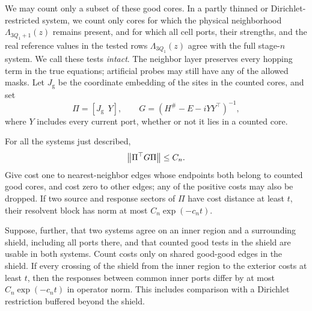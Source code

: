 We may count only a subset of these good cores. In a partly thinned
or Dirichlet-restricted system, we count only cores for which the
physical neighborhood $\Lambda_{3Q_1+1}(z)$ remains present, and for
which all cell ports, their strengths, and the real reference values
in the tested rows $\Lambda_{3Q_1}(z)$ agree with the full stage-$n$
system. We call these tests \emph{intact}. The neighbor layer preserves
every hopping term in the true equations; artificial probes may still
have any of the allowed masks.
Let $J_{\mathrm g}$ be the coordinate embedding of the sites in the
counted cores, and set
\[
 \Pi=[J_{\mathrm g}\ \ Y],\qquad
 G=(H^\#-E-iYY^\top)^{-1},
\]
where $Y$ includes every current port, whether or not it lies in a
counted core.

\begin{proposition}
\label{screen:projected}
For all the systems just described,
\begin{equation}
 \left\lVert\Pi^\top G\Pi\right\rVert\leq C_n.
 \label{screen:projected-bound}
\end{equation}
Give cost one to nearest-neighbor edges whose endpoints both belong
to counted good cores, and cost zero to other edges; any of the
positive costs may also be dropped. If two source and response sectors
of $\Pi$ have cost distance at least $t$, their resolvent block has
norm at most $C_n\exp(-c_nt)$.

Suppose, further, that two systems agree on an inner region and a
surrounding shield, including all ports there, and that counted good
tests in the shield are usable in both systems. Count costs only on
shared good-good edges in the shield. If every crossing of the shield
from the inner region to the exterior costs at least $t$, then the
responses between common inner ports differ by at most
$C_n\exp(-c_nt)$ in operator norm. This includes comparison with a
Dirichlet restriction buffered beyond the shield.
\end{proposition}

